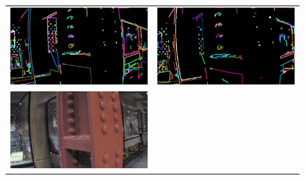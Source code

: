 \documentclass{acmsiggraph}
\begin{document}
\begin{figure}[h]
  \centering
  \begin{tabular}{cc}
    \includegraphics[resolution=150, scale=0.75]{images/contour-lines1} &
    \includegraphics[resolution=150, scale=0.75]{images/contour-lines2} \\
    \includegraphics[resolution=150, scale=0.75]{images/contour-kp1} &

\end{tabular}
\end{figure}
\end{document}
